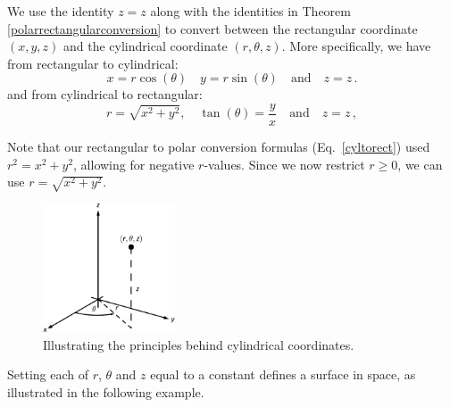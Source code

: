 We use the identity $z=z$ along with the identities in Theorem \ref{polarrectangularconversion} to convert between the  rectangular coordinate $(x,y,z)$ and the  cylindrical coordinate $(r,\theta,z)$. More specifically, we have from rectangular to cylindrical:
\begin{equation}
x=r\cos(\theta)\quad y=r\sin(\theta)\quad \text{and}\quad z=z\,.
\label{rectocyl}
\end{equation}
and from cylindrical to rectangular:
\begin{equation}
r=\sqrt{x^2+y^2},\quad \tan(\theta) = \dfrac{y}{x} \quad\text{and}\quad z=z\,,
\label{cyltorect}
\end{equation}

Note that our rectangular to polar conversion formulas (Eq.~\eqref{cyltorect}) used $r^2=x^2+y^2$, allowing for negative $r$-values. Since we now restrict $r\geq 0$, we can use $r=\sqrt{x^2+y^2}$.

\begin{figure}[h]
	\begin{center}
			\includegraphics[width=0.35\textwidth]{fig_multiple_27}
	\caption{Illustrating the principles behind cylindrical coordinates.}
	\label{fig_multiple_27}
	\end{center}
\end{figure}

Setting each of $r$, $\theta$ and $z$ equal to a constant defines a surface in space, as illustrated in the following example.

